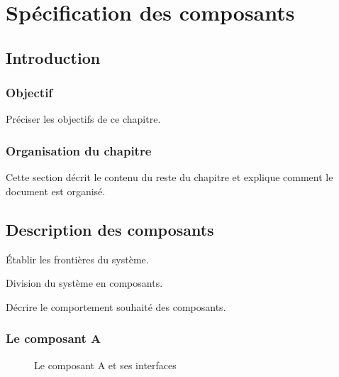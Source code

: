 
	\chapter{Spécification des composants}

		\section{Introduction}

			\subsection{Objectif}
Préciser les objectifs de ce chapitre. 

			\subsection{Organisation du chapitre}
Cette section décrit le contenu du reste du chapitre  et explique comment le document est organisé.


		\section{Description des composants}

Établir les frontières du système.

Division du système en composants.

Décrire le comportement souhaité des composants.

\subsection{Le composant A}

\begin{figure}[htbp]
	\centering
	\caption{Le composant A et ses interfaces}
	\label{fig:label}
\end{figure}

		
